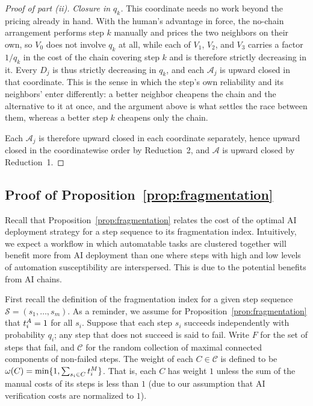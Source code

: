 \begin{proof}[Proof of part (ii)]
\emph{Closure in $q_k$.}
This coordinate needs no work beyond the pricing already in hand.
With the human's advantage in force, the no-chain arrangement performs step $k$ manually and prices the two neighbors on their own, so $V_0$ does not involve $q_k$ at all, while each of $V_1$, $V_2$, and $V_3$ carries a factor $1/q_k$ in the cost of the chain covering step $k$ and is therefore strictly decreasing in it.
Every $D_j$ is thus strictly decreasing in $q_k$, and each $\mathcal{A}_j$ is upward closed in that coordinate.
This is the sense in which the step's own reliability and its neighbors' enter differently: a better neighbor cheapens the chain and the alternative to it at once, and the argument above is what settles the race between them, whereas a better step $k$ cheapens only the chain.

Each $\mathcal{A}_j$ is therefore upward closed in each coordinate separately, hence upward closed in the coordinatewise order by Reduction~2, and $\mathcal{A}$ is upward closed by Reduction~1.
\end{proof}

\subsection{Proof of Proposition~\ref{prop:fragmentation}}
\label{app:fragmentation_proof}

Recall that Proposition~\ref{prop:fragmentation} relates the cost of the optimal AI deployment strategy for a step sequence to its fragmentation index.
Intuitively, we expect a workflow in which automatable tasks are clustered together will benefit more from AI deployment than one where steps with high and low levels of automation susceptibility are interspersed.
This is due to the potential benefits from AI chains.

First recall the definition of the fragmentation index for a given step sequence $\mathcal{S} = (s_1, \dotsc, s_m)$.
As a reminder, we assume for Proposition~\ref{prop:fragmentation} that $t^{A}_{i} = 1$ for all $s_i$.
Suppose that each step $s_i$ succeeds independently with probability $q_i$; any step that does not succeed is said to fail.
Write $F$ for the set of steps that fail, and $\mathcal{C}$ for the random collection of maximal connected components of non-failed steps.
The weight of each $C \in \mathcal{C}$ is defined to be $\omega(C) = \min\{ 1, \sum_{s_i \in C} t^{M}_{i} \}$.
That is, each $C$ has weight $1$ unless the sum of the manual costs of its steps is less than $1$ (due to our assumption that AI verification costs are normalized to $1$).

